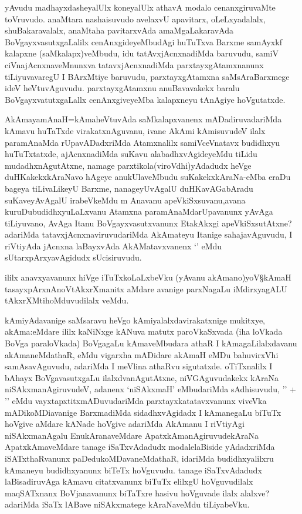 \begin{artha}
yAvudu madhayxdasheyalUlx koneyalUlx athavA modalo cenanxgiruvaMte toVruvudo. anaMtara nashaisuvudo avelaxvU apavitarx, oLeLxyadalalx, shuBakaravalalx, anaMtaha pavitarxvAda amaMgaLakaravAda BoVgayxvasutxgaLalilx cenAnxgideyeMbudAgi huTuTxva Barxme samAyxkf kalapxne (saMkalapx)veMbudu, idu tatAvxjAcnxnadiMda baruvudu, samiV ciVnajAcnxnaveMnunxva tatavxjAcnxnadiMda parxtayxgAtamxnanunx tiLiyuvavaregU I BArxMtiye baruvudu, parxtayxgAtamxna saMsAraBarxmege ideV heVtuvAguvudu. parxtayxgAtamxnu anuBavavakekx baralu BoVgayxvatutxgaLallx cenAnxgiveyeMba kalapxneyu tAnAgiye hoVgutatxde.
\end{artha}

\begin{artha}
AkAmayamAnaH=kAmaheVtuvAda saMkalapxvanenx mADadiruvadariMda kAmavu huTaTxde virakatxnAguvanu, ivane AkAmi kAmisuvudeV ilalx paramAnaMda rUpavADadxriMda Atamxnalilx samiVceVnatavx budidhxyu huTuTxtatxde, ajAcnxnadiMda suKavu alabadhxvAgideyeMdu tiLidu mudadhxnAgutAtxne, namage parxtikola(viroVdhi)yAdadudx heVge duHKakekxkAraNavo hAgeye anukUlaveMbudu suKakekxkAraNa-eMba eraDu bageya tiLivaLikeyU Barxme, nanageyUvAgalU duHKavAGabAradu suKaveyAvAgalU irabeVkeMdu m Anavanu apeVkiSxsuvanu,avana kuruDubudidhxyuLaLxvanu Atamxna paramAnaMdarUpavanunx yAvAga tiLiyuvano, AvAga Itanu BoVgayxvasutxvanunx EtakAkxgi apeVkiSxsutAtxne? adariMda tatavxjAcnxnaviruvudariMda AkAmateyu Itanige sahajavAguvudu, I riVtiyAda jAcnxna laBayxvAda AkAMatavxvanenx `\stext' eMdu sUtarxpArxyavAgidudx sUcisiruvudu. 
\end{artha}

\begin{artha}
ililx anavxyavanunx hiVge iTuTxkoLaLxbeVku (yAvanu akAmano)yoV\S kAmaH tasayxpArxnAnoVtAkxrXmanitx aMdare avanige parxNagaLu iMdirxyagALU tAkxrXMtihoMduvudilalx veMdu.
\end{artha}

\begin{artha}
kAmiyAdavanige saMsaravu heVgo kAmiyalalxdavirakatxnige mukitxye, akAma:eMdare ililx kaNiNxge kANuva matutx paroVkaSxvada (iha loVkada BoVga paraloVkada) BoVgagaLu kAmaveMbudara athaR I kAmagaLilalxdavanu akAmaneMdathaR, \stext eMdu vigarxha mADidare akAmaH eMDu bahuvirxVhi samAsavAguvudu, adariMda I meVlina athaRvu sigutatxde. oTiTxnalilx I bAhayx BoVgavasutxgaLu ilalxdvanAgutAtxne, niVGAguvudakekx kAraNa niSAkxmanAgiruvudeV, adanenx `niSAkxmaH' eMbudariMda sAdhisuvudu, '\stext' + '\stext' eMdu vayxtapxtitxmADuvudariMda parxtayxkatatavxvanunx viveVka mADikoMDiavanige BarxmadiMda sidadhxvAgidadx I kAmanegaLu biTuTx hoVgive aMdare kANade hoVgive adariMda AkAmanu I riVtiyAgi niSAkxmanAgalu EnukAranaveMdare ApatxkAmanAgiruvudekAraNa ApatxkAmaveMdare tanage iSaTxvAdadudx modalelaBiside yAdadxriMda iSATxthaRvanunx paDedukoMDavaneMdathaR, idariMda budidhxyalilxru kAmaneyu budidhxyanunx biTeTx hoVguvudu. tanage iSaTxvAdadudx laBisadiruvAga kAmavu citatxvanunx biTuTx elilxgU hoVguvudilalx maqSATxnanx BoVjanavanunx biTaTxre hasivu hoVguvade ilalx alalxve? adariMda iSaTx lABave niSAkxmatege kAraNaveMdu tiLiyabeVku.
\end{artha}

